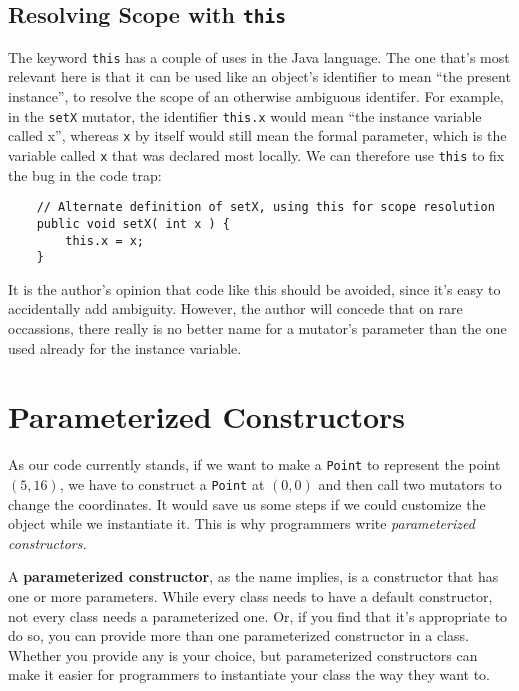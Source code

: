 \subsection{Resolving Scope with \texttt{this}}

The keyword \texttt{this} has a couple of uses in the Java language.  The one that's most relevant here is that it can be used like an object's identifier to mean ``the present instance'', to resolve the scope of an otherwise ambiguous identifer.  For example, in the \texttt{setX} mutator, the identifier \texttt{this.x} would mean ``the instance variable called x'', whereas \texttt{x} by itself would still mean the formal parameter, which is the variable called \texttt{x} that was declared most locally.  We can therefore use \texttt{this} to fix the bug in the code trap:

\begin{verbatim}
    // Alternate definition of setX, using this for scope resolution
    public void setX( int x ) {
        this.x = x;
    }
\end{verbatim}

It is the author's opinion that code like this should be avoided, since it's easy to accidentally add ambiguity.  However, the author will concede that on rare occassions, there really is no better name for a mutator's parameter than the one used already for the instance variable.

\section{Parameterized Constructors}
\label{section:parameterized-constructors}

As our code currently stands, if we want to make a \texttt{Point} to represent the point $(5, 16)$, we have to construct a \texttt{Point} at $(0,0)$ and then call two mutators to change the coordinates.  It would save us some steps if we could customize the object while we instantiate it.  This is why programmers write \textit{parameterized constructors.}

A \textbf{parameterized constructor}, as the name implies, is a constructor that has one or more parameters.  While every class needs to have a default constructor, not every class needs a parameterized one.  Or, if you find that it's appropriate to do so, you can provide more than one parameterized constructor in a class.  Whether you provide any is your choice, but parameterized constructors can make it easier for programmers to instantiate your class the way they want to.

